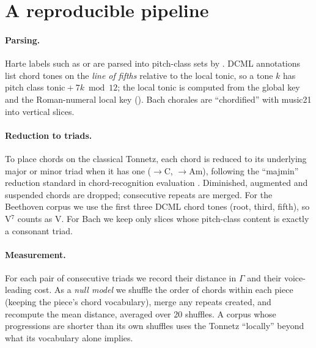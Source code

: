 \section{A reproducible pipeline}
\paragraph{Parsing.} Harte labels such as  or  are parsed into pitch-class sets by
. DCML annotations list chord tones on the \emph{line of fifths} relative to the local tonic, so
a tone $k$ has pitch class $\text{tonic}+7k \bmod 12$; the local tonic is computed from the global key and the
Roman-numeral local key (). Bach chorales are ``chordified'' with music21 into vertical
slices.

\paragraph{Reduction to triads.} To place chords on the classical Tonnetz, each chord is reduced to its underlying
major or minor triad when it has one ($\to$C, $\to$Am), following the ``majmin'' reduction
standard in chord-recognition evaluation \citep{raffel2014}. Diminished, augmented and suspended chords are dropped;
consecutive repeats are merged. For the Beethoven corpus we use the first three DCML chord tones (root, third,
fifth), so V$^7$ counts as V. For Bach we keep only slices whose pitch-class content is exactly a consonant triad.

\paragraph{Measurement.} For each pair of consecutive triads we record their distance in $\Gamma$ and their
voice-leading cost. As a \emph{null model} we shuffle the order of chords within each piece (keeping the piece's
chord vocabulary), merge any repeats created, and recompute the mean distance, averaged over 20 shuffles. A corpus
whose progressions are shorter than its own shuffles uses the Tonnetz ``locally'' beyond what its vocabulary alone
implies.

